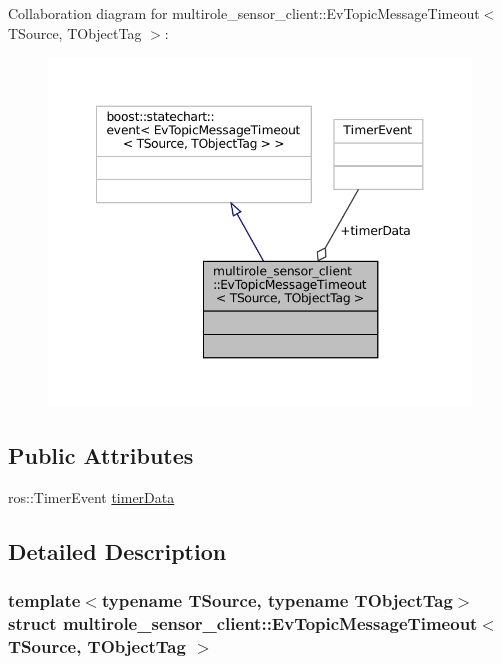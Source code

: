 Collaboration diagram for multirole\+\_\+sensor\+\_\+client\+:\+:Ev\+Topic\+Message\+Timeout$<$ T\+Source, T\+Object\+Tag $>$\+:
\nopagebreak
\begin{figure}[H]
\begin{center}
\leavevmode
\includegraphics[width=348pt]{structmultirole__sensor__client_1_1EvTopicMessageTimeout__coll__graph}
\end{center}
\end{figure}
\subsection*{Public Attributes}
\begin{DoxyCompactItemize}
\item 
ros\+::\+Timer\+Event \hyperlink{structmultirole__sensor__client_1_1EvTopicMessageTimeout_acf6851104497bd60ac389051f5b4f2b0}{timer\+Data}
\end{DoxyCompactItemize}


\subsection{Detailed Description}
\subsubsection*{template$<$typename T\+Source, typename T\+Object\+Tag$>$\newline
struct multirole\+\_\+sensor\+\_\+client\+::\+Ev\+Topic\+Message\+Timeout$<$ T\+Source, T\+Object\+Tag $>$}



